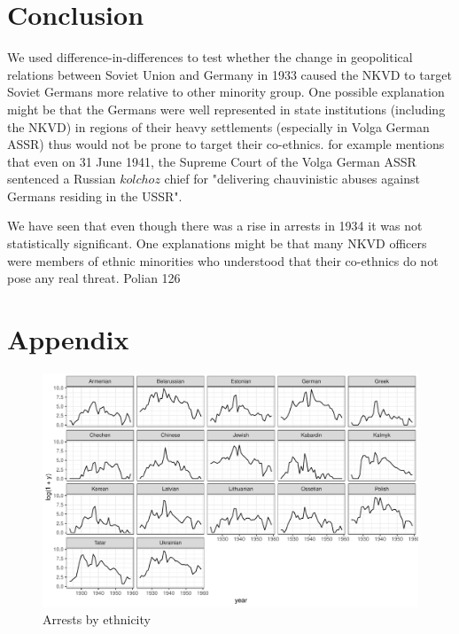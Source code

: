 \documentclass[12pt]{article}
\begin{document}
\section{Conclusion}
We used difference-in-differences to test whether the change in geopolitical relations between Soviet Union and Germany in 1933 caused the NKVD to target Soviet Germans more relative to other minority group. One possible explanation might be that the Germans were well represented in state institutions (including the NKVD) in regions of their heavy settlements (especially in Volga German ASSR) thus would not be prone to target their co-ethnics. \citet[p. 126]{polian_against_2003} for example mentions that even on 31 June 1941, the Supreme Court of the Volga German ASSR sentenced a Russian $kolchoz$ chief for "delivering chauvinistic abuses against Germans residing in the USSR".

We have seen that even though there was a rise in arrests in 1934 it was not statistically significant. One explanations might be that many NKVD officers were members of ethnic minorities who understood that their co-ethnics do not pose any real threat.  Polian 126




\newpage
\section*{Appendix}

\begin{figure}[h]
\centering
\includegraphics[width=\textwidth]{plots/arrests_by_ethnicity.pdf}
\caption{Arrests by ethnicity}
\label{fig:universe}
\end{figure}
\newpage
\thispagestyle{empty}

\end{document}
